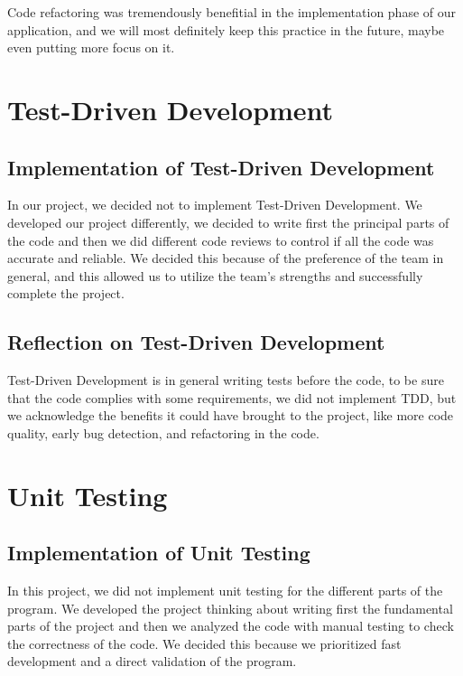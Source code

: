 \documentclass[12pt]{report}
\begin{document}
Code refactoring was tremendously benefitial in the implementation phase of our application, and we will most definitely
keep this practice in the future, maybe even putting more focus on it.

\section{Test-Driven Development}
\subsection*{Implementation of Test-Driven Development}

In our project, we decided not to implement Test-Driven Development. We developed our project differently, we decided to write 
first the principal parts of the code and then we did different code reviews to control if all the code was accurate and reliable. 
We decided this because of the preference of the team in general, and this allowed us to utilize the team's strengths and 
successfully complete the project.

\subsection*{Reflection on Test-Driven Development}

Test-Driven Development is in general writing tests before the code, to be sure that the code complies with some requirements, 
we did not implement TDD, but we acknowledge the benefits it could have brought to the project, like more code quality, 
early bug detection, and refactoring in the code.

\section{Unit Testing}
\subsection*{Implementation of Unit Testing}

In this project, we did not implement unit testing for the different parts of the program. We developed the project thinking about 
writing first the fundamental parts of the project and then we analyzed the code with manual testing to check the correctness of the code. 
We decided this because we prioritized fast development and a direct validation of the program.
\end{document}
